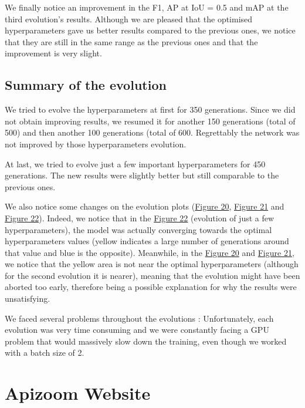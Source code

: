 \documentclass{article}
\begin{document}
\bigskip

We finally notice an improvement in the F1, AP at IoU = 0.5 and mAP at the third evolution's results. Although we are pleased that the optimised hyperparameters gave us better results compared to the previous ones, we notice that they are still in the same range as the previous ones and that the improvement is very slight.

\bigskip

\subsection{Summary of the evolution}


We tried to evolve the hyperparameters at first for 350 generations. Since we did not obtain improving results, we resumed it for another 150 generations (total of 500) and then another 100 generations (total of 600. Regrettably the network was not improved by those hyperparameters evolution.

\bigskip

At last, we tried to evolve just a few important hyperparameters for 450 generations. The new results were slightly better but still comparable to the previous ones.

\bigskip

We also notice some changes on the evolution plots (\hyperref[Figure 20]{Figure 20}, \hyperref[Figure 21]{Figure 21} and \hyperref[Figure 22]{Figure 22}). Indeed, we notice that in the \hyperref[Figure 22]{Figure 22} (evolution of just a few hyperparameters), the model was actually converging towards the optimal hyperparameters values (yellow indicates a large number of generations around that value and blue is the opposite). Meanwhile, in the \hyperref[Figure 20]{Figure 20} and \hyperref[Figure 21]{Figure 21}, we notice that the yellow area is not near the optimal hyperparameters (although for the second evolution it is nearer), meaning that the evolution might have been aborted too early, therefore being a possible explanation for why the results were unsatisfying.

\bigskip

We faced several problems throughout the evolutions : Unfortunately, each evolution was very time consuming and we were constantly facing a GPU problem that would massively slow down the training, even though we worked with a batch size of 2.

\newpage
\section{Apizoom Website}
\end{document}
